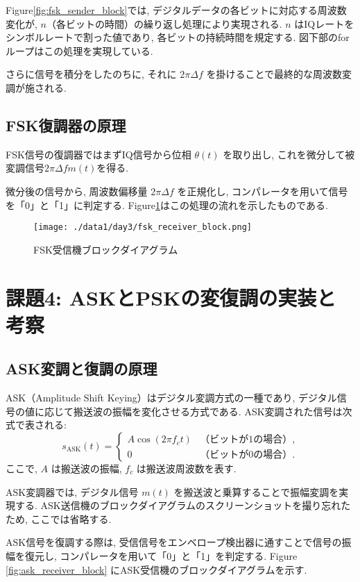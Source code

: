 \documentclass[a4paper, twocolumn]{article} %
\begin{document}
Figure\ref{fig:fsk_sender_block}では, デジタルデータの各ビットに対応する周波数変化が, \(n\)（各ビットの時間）の繰り返し処理により実現される. \(n\) はIQレートをシンボルレートで割った値であり, 各ビットの持続時間を規定する. 図下部のforループはこの処理を実現している.

さらに信号を積分をしたのちに, それに \(2\pi\Delta f\) を掛けることで最終的な周波数変調が施される.

\subsection{FSK復調器の原理}
FSK信号の復調器ではまずIQ信号から位相 \(\theta(t)\) を取り出し, これを微分して被変調信号\(2\pi \Delta f m(t)\)を得る. 

微分後の信号から, 周波数偏移量 \(2\pi\Delta f\) を正規化し, コンパレータを用いて信号を「0」と「1」に判定する. Figure\ref{fig:fsk_receiver_block}はこの処理の流れを示したものである.

\begin{figure}[H]
    \centering
    \texttt{[image: ./data1/day3/fsk\_receiver\_block.png]}
    \caption{FSK受信機ブロックダイアグラム}
    \label{fig:fsk_receiver_block}
\end{figure}

\section{課題4: ASKとPSKの変復調の実装と考察}
\subsection{ASK変調と復調の原理}
ASK（Amplitude Shift Keying）はデジタル変調方式の一種であり, デジタル信号の値に応じて搬送波の振幅を変化させる方式である. ASK変調された信号は次式で表される:
\[
s_{\text{ASK}}(t) =
\begin{cases}
A \cos(2\pi f_c t) & \text{（ビットが1の場合）}, \\
0 & \text{（ビットが0の場合）}.
\end{cases}
\]
ここで, \(A\) は搬送波の振幅, \(f_c\) は搬送波周波数を表す.

ASK変調器では, デジタル信号 \(m(t)\) を搬送波と乗算することで振幅変調を実現する. ASK送信機のブロックダイアグラムのスクリーンショットを撮り忘れたため, ここでは省略する.

ASK信号を復調する際は, 受信信号をエンベロープ検出器に通すことで信号の振幅を復元し, コンパレータを用いて「0」と「1」を判定する. Figure \ref{fig:ask_receiver_block} にASK受信機のブロックダイアグラムを示す.
\end{document}

